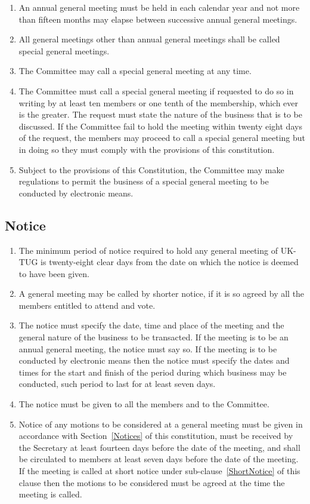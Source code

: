 \documentclass[a4paper,11pt]{article}
\begin{document}
\begin{enumerate}
\item An annual general meeting must be held in each calendar year and not
  more than fifteen months may elapse between successive annual general
  meetings.
\item All general meetings other than annual general meetings shall be called
  special general meetings.
\item The Committee may call a special general meeting at any time.
\item The Committee must call a special general meeting if requested to do so in
  writing by at least ten members or one tenth of the membership, which ever is
  the greater. The request must state the nature of the business that is to be
  discussed. If the Committee fail to hold the meeting within twenty eight days
  of the request, the members may proceed to call a special general meeting but
  in doing so they must comply with the provisions of this constitution.
\item Subject to the provisions of this Constitution, the Committee may make 
  regulations to permit the business of a special general meeting to be
  conducted by electronic means.
\end{enumerate}

\subsection{Notice}

\begin{enumerate}
\item The minimum period of notice required to hold any general meeting of
  UK-TUG is twenty-eight clear days from the date on which the notice is deemed to
  have been given.
\item \label{ShortNotice} A general meeting may be called by shorter notice, 
  if it is so agreed by all the members entitled to attend and vote.
\item The notice must specify the date, time and place of the meeting and the
  general nature of the business to be transacted. If the meeting is to be an
  annual general meeting, the notice must say so. If the meeting is to be conducted
  by electronic means then the notice must specify the dates and times for the
  start and finish of the period during which business may be conducted, such period to
  last for at least seven days.
\item The notice must be given to all the members and to the Committee.
\item Notice of any motions to be considered at a general meeting must be
  given in accordance with Section~\ref{Notices} of this constitution, 
  must be received by the Secretary at least fourteen days before the 
  date of the meeting, and shall be circulated to members at least
  seven days before the date of the meeting. If the meeting is called
  at short notice under sub-clause~\ref{ShortNotice} of this clause then
  the motions to be considered must be agreed at the time the meeting 
  is called.
\end{enumerate}
\end{document}
